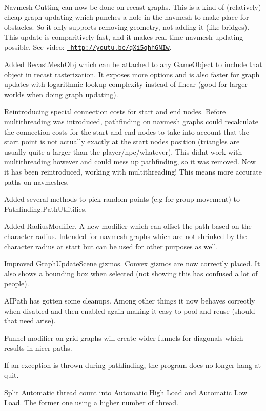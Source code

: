 \begin{DoxyItemize}
\begin{DoxyItemize}
\begin{DoxyItemize}
\item Navmesh Cutting can now be done on recast graphs. This is a kind of (relatively) cheap graph updating which punches a hole in the navmesh to make place for obstacles. So it only supports removing geometry, not adding it (like bridges). This update is comparitively fast, and it makes real time navmesh updating possible. See video\+: \href{http://youtu.be/qXi5qhhGNIw}{\texttt{ http\+://youtu.\+be/q\+Xi5qhh\+G\+N\+Iw}}.
\item Added Recast\+Mesh\+Obj which can be attached to any Game\+Object to include that object in recast rasterization. It exposes more options and is also faster for graph updates with logarithmic lookup complexity instead of linear (good for larger worlds when doing graph updating).
\item Reintroducing special connection costs for start and end nodes. Before multithreading was introduced, pathfinding on navmesh graphs could recalculate the connection costs for the start and end nodes to take into account that the start point is not actually exactly at the start node\textquotesingle{}s position (triangles are usually quite a larger than the player/npc/whatever). This didn\textquotesingle{}t work with multithreading however and could mess up pathfinding, so it was removed. Now it has been reintroduced, working with multithreading! This means more accurate paths on navmeshes.
\item Added several methods to pick random points (e.\+g for group movement) to Pathfinding.\+Path\+Utlitilies.
\item Added Radius\+Modifier. A new modifier which can offset the path based on the character radius. Intended for navmesh graphs which are not shrinked by the character radius at start but can be used for other purposes as well.
\item Improved Graph\+Update\+Scene gizmos. Convex gizmos are now correctly placed. It also shows a bounding box when selected (not showing this has confused a lot of people).
\item A\+I\+Path has gotten some cleanups. Among other things it now behaves correctly when disabled and then enabled again making it easy to pool and reuse (should that need arise).
\item Funnel modifier on grid graphs will create wider funnels for diagonals which results in nicer paths.
\item If an exception is thrown during pathfinding, the program does no longer hang at quit.
\item Split Automatic thread count into Automatic High Load and Automatic Low Load. The former one using a higher number of thread.

\end{DoxyItemize}
\end{DoxyItemize}
\end{DoxyItemize}
